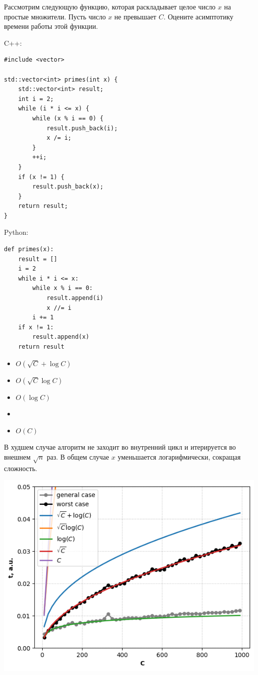 \documentclass[a4paper]{article}
\begin{document}
Рассмотрим следующую функцию, которая раскладывает целое число $x$ на простые множители. Пусть число $x$ не превышает $C$. Оцените асимптотику времени работы этой функции.

\SPACE

\noindent C++:

\begin{lstlisting}[style=C++]
#include <vector>

std::vector<int> primes(int x) {
    std::vector<int> result;
    int i = 2;
    while (i * i <= x) {
        while (x % i == 0) {
            result.push_back(i);
            x /= i;
        }
        ++i;
    }
    if (x != 1) {
        result.push_back(x);
    }
    return result;
}
\end{lstlisting}

\SPACE

\noindent Python:

\begin{lstlisting}[style=Python]
def primes(x):
    result = []
    i = 2
    while i * i <= x:
        while x % i == 0:
            result.append(i)
            x //= i
        i += 1
    if x != 1:
        result.append(x)
    return result
\end{lstlisting}

\SPACE

\LINE

\SPACE

\begin{itemize}
\item $O(\sqrt{C} + \log C)$
\item $O(\sqrt{C} \log C)$
\item $O(\log C)$
\item {}
\item $O(C)$
\end{itemize}

\SPACE

\newpage

В худшем случае алгоритм не заходит во внутренний цикл и итерируется во внешнем $\sqrt{n}$ раз. В общем случае $x$ уменьшается логарифмически, сокращая сложность.

\begin{center}
\includegraphics[width=15cm]{6.png}
\end{center}
\end{document}

